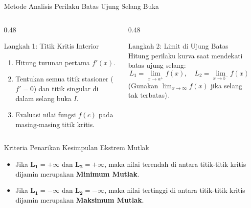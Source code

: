 \documentclass[aspectratio=43,10pt]{beamer}
\begin{document}
\begin{frame}{Metode Analisis Perilaku Batas Ujung Selang Buka}
    \begin{columns}[T]
        \begin{column}{0.48\textwidth}
            \begin{exampleblock}{Langkah 1: Titik Kritis Interior}
                \begin{enumerate}
                    \item Hitung turunan pertama $f'(x)$.
                    \item Tentukan semua titik stasioner ($f'=0$) dan titik singular di dalam selang buka $I$.
                    \item Evaluasi nilai fungsi $f(c)$ pada masing-masing titik kritis.
                \end{enumerate}
            \end{exampleblock}
        \end{column}

        \begin{column}{0.48\textwidth}
            \begin{exampleblock}{Langkah 2: Limit di Ujung Batas}
                Hitung perilaku kurva saat mendekati batas ujung selang:
                \[
                    L_1 = \lim_{x \to a^+} f(x), \quad L_2 = \lim_{x \to b^-} f(x)
                \]
                {\scriptsize (Gunakan $\lim_{x \to \infty} f(x)$ jika selang tak terbatas).}
            \end{exampleblock}
        \end{column}
    \end{columns}

    \vspace{0.08cm}
    \begin{alertblock}{Kriteria Penarikan Kesimpulan Ekstrem Mutlak}
        \begin{itemize}
            \item Jika $\mathbf{L_1 = +\infty}$ dan $\mathbf{L_2 = +\infty}$, maka nilai terendah di antara titik-titik kritis dijamin merupakan \textbf{Minimum Mutlak}.
            \item Jika $\mathbf{L_1 = -\infty}$ dan $\mathbf{L_2 = -\infty}$, maka nilai tertinggi di antara titik-titik kritis dijamin merupakan \textbf{Maksimum Mutlak}.
        \end{itemize}
    \end{alertblock}
\end{frame}
\end{document}
